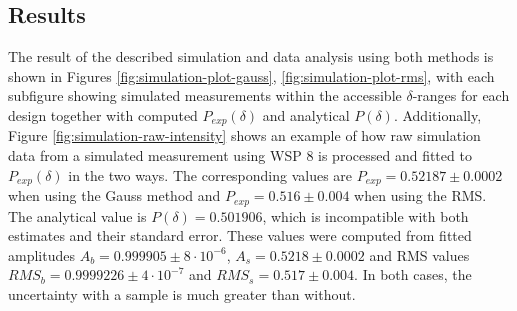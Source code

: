 \documentclass{article}
\begin{document}
\subsection{Results}
The result of the described simulation and data analysis using both methods is shown in Figures \ref{fig:simulation-plot-gauss}, \ref{fig:simulation-plot-rms}, with each subfigure showing simulated measurements within the accessible $\delta$-ranges for each design together with computed $P_{exp}(\delta)$ and analytical $P(\delta)$. Additionally, Figure \ref{fig:simulation-raw-intensity} shows an example of how raw simulation data from a simulated measurement using WSP 8 is processed and fitted to $P_{exp}(\delta)$ in the two ways. The corresponding values are $P_{exp} = 0.52187 \pm 0.0002$ when using the Gauss method and $P_{exp} = 0.516 \pm 0.004$ when using the RMS. The analytical value is $P(\delta) = 0.501906$, which is incompatible with both estimates and their standard error. These values were computed from fitted amplitudes $A_b = 0.999905 \pm 8\cdot 10^{-6}$, $A_s = 0.5218 \pm 0.0002$ and RMS values $RMS_b = 0.9999226 \pm 4\cdot 10^{-7}$ and $RMS_s = 0.517 \pm 0.004$. In both cases, the uncertainty with a sample is much greater than without.
\end{document}
